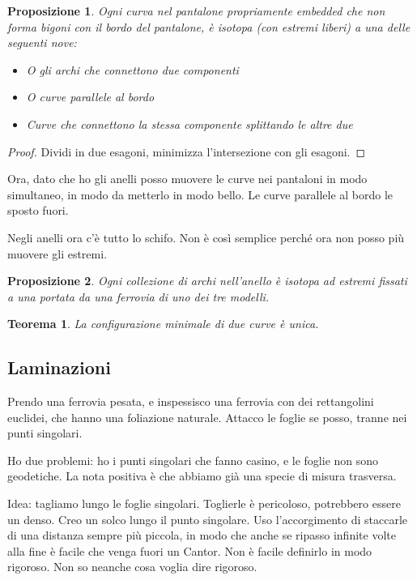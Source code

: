 \documentclass[a4paper]{article}
\newtheorem{theorem}{Teorema}
\newtheorem{proposition}{Proposizione}
\theoremstyle{definition}
\begin{document}
    \begin{proposition}
        Ogni curva nel pantalone propriamente embedded che non forma bigoni con il bordo del pantalone, è isotopa (con estremi liberi) a una delle seguenti nove:
        \begin{itemize}
            \item O gli archi che connettono due componenti
            \item O curve parallele al bordo
            \item Curve che connettono la stessa componente splittando le altre due
        \end{itemize}
    \end{proposition}

    \begin{proof}
        Dividi in due esagoni, minimizza l'intersezione con gli esagoni.
    \end{proof}
    
    Ora, dato che ho gli anelli posso muovere le curve nei pantaloni in modo simultaneo, in modo da metterlo in modo bello. Le curve parallele al bordo le sposto fuori.

    Negli anelli ora c'è tutto lo schifo. Non è così semplice perché ora non posso più muovere gli estremi.

    \begin{proposition}
        Ogni collezione di archi nell'anello è isotopa ad estremi \emph{fissati} a una portata da una ferrovia di uno dei tre modelli.
    \end{proposition}
    
    \begin{theorem}
        La configurazione minimale di due curve è unica.
    \end{theorem}
    
\subsection{Laminazioni}

    Prendo una ferrovia pesata, e inspessisco una ferrovia con dei rettangolini euclidei, che hanno una foliazione naturale. Attacco le foglie se posso, tranne nei punti singolari.
    
    Ho due problemi: ho i punti singolari che fanno casino, e le foglie non sono geodetiche. La nota positiva è che abbiamo già una specie di misura trasversa.

    Idea: tagliamo lungo le foglie singolari. Toglierle è pericoloso, potrebbero essere un denso. Creo un solco lungo il punto singolare. Uso l'accorgimento di staccarle di una distanza sempre più piccola, in modo che anche se ripasso infinite volte alla fine è facile che venga fuori un Cantor. Non è facile definirlo in modo rigoroso. Non so neanche cosa voglia dire rigoroso.
    
\end{document}

